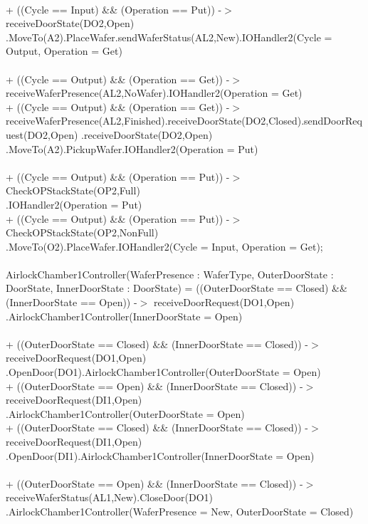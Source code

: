 \documentclass[a4paper,12pt]{article}
\begin{document}
\\+ ((Cycle == Input) \&\& (Operation == Put)) -$>$ receiveDoorState(DO2,Open)
\\.MoveTo(A2).PlaceWafer.sendWaferStatus(AL2,New).IOHandler2(Cycle = Output, Operation = Get)
\\
\\+ ((Cycle == Output) \&\& (Operation == Get)) -$>$ receiveWaferPresence(AL2,NoWafer).IOHandler2(Operation = Get)
\\+ ((Cycle == Output) \&\& (Operation == Get)) -$>$ receiveWaferPresence(AL2,Finished).receiveDoorState(DO2,Closed).sendDoorRequest(DO2,Open)
.receiveDoorState(DO2,Open)
\\.MoveTo(A2).PickupWafer.IOHandler2(Operation = Put)
\\
\\+ ((Cycle == Output) \&\& (Operation == Put)) -$>$ CheckOPStackState(OP2,Full)
\\.IOHandler2(Operation = Put)
\\+ ((Cycle == Output) \&\& (Operation == Put)) -$>$ CheckOPStackState(OP2,NonFull)
\\.MoveTo(O2).PlaceWafer.IOHandler2(Cycle = Input, Operation = Get);
\\
\\AirlockChamber1Controller(WaferPresence : WaferType, OuterDoorState : DoorState, InnerDoorState : DoorState) =
((OuterDoorState == Closed) \&\& (InnerDoorState == Open)) -$>$ receiveDoorRequest(DO1,Open)
\\.AirlockChamber1Controller(InnerDoorState = Open)
\\
\\+ ((OuterDoorState == Closed) \&\& (InnerDoorState == Closed)) -$>$ receiveDoorRequest(DO1,Open)
\\.OpenDoor(DO1).AirlockChamber1Controller(OuterDoorState = Open)
\\+ ((OuterDoorState == Open) \&\& (InnerDoorState == Closed)) -$>$ receiveDoorRequest(DI1,Open)
\\.AirlockChamber1Controller(OuterDoorState = Open)
\\+ ((OuterDoorState == Closed) \&\& (InnerDoorState == Closed)) -$>$ receiveDoorRequest(DI1,Open)
\\.OpenDoor(DI1).AirlockChamber1Controller(InnerDoorState = Open)
\\
\\+ ((OuterDoorState == Open) \&\& (InnerDoorState == Closed)) -$>$ receiveWaferStatus(AL1,New).CloseDoor(DO1)
\\.AirlockChamber1Controller(WaferPresence = New, OuterDoorState = Closed)
\end{document}
